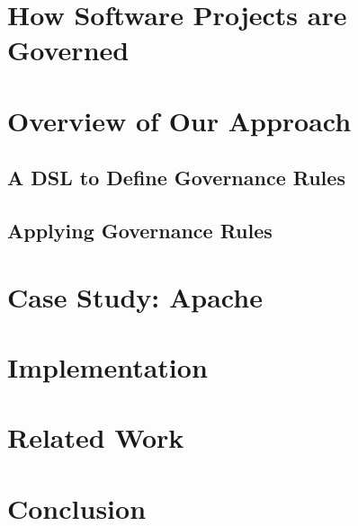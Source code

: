 \documentclass{llncs}
\begin{document}
\section{How Software Projects are Governed} 
\label{sec:motivation}


\section{Overview of Our Approach}
\label{sec:approach}


\subsection{A DSL to Define Governance Rules}
\label{sec:dsl}


\subsection{Applying Governance Rules} 
\label{sec:collaboration}


\section{Case Study: Apache}
\label{sec:example}


\section{Implementation}  
\label{sec:implementation}


\section{Related Work} 
\label{sec:relatedWork}


\section{Conclusion} 
\label{sec:conclusion}




\end{document}
